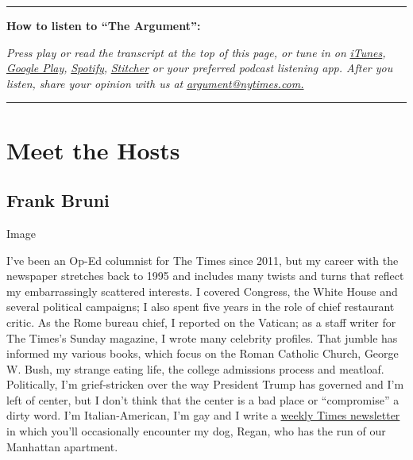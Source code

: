 \begin{center}\rule{0.5\linewidth}{\linethickness}\end{center}

\textbf{How to listen to ``The Argument'':}

\emph{Press play or read the transcript at the top of this page, or tune
in on}
\href{https://itunes.apple.com/us/podcast/the-argument/id1438024613?mt=2}{\emph{iTunes}}\emph{,}
\href{https://play.google.com/music/listen?u=0\#/ps/Idxib4hsg3yviao4gtym76knjjy}{\emph{Google
Play}}\emph{,}
\href{https://open.spotify.com/episode/5fIsHqqunLBwoxPSUUSGre?si=Rz5D9VnlRFKdGMu8ixzBOw}{\emph{Spotify}}\emph{,}
\href{https://www.stitcher.com/podcast/the-new-york-times/the-argument}{\emph{Stitcher}}
\emph{or your preferred podcast listening app. After you listen, share
your opinion with us at}
\href{mailto:argument@nytimes.com}{\emph{argument@nytimes.com.}}

\begin{center}\rule{0.5\linewidth}{\linethickness}\end{center}

\hypertarget{meet-the-hosts}{%
\section{Meet the Hosts}\label{meet-the-hosts}}

\hypertarget{frank-bruni}{%
\subsection{Frank Bruni}\label{frank-bruni}}

Image

I've been an Op-Ed columnist for The Times since 2011, but my career
with the newspaper stretches back to 1995 and includes many twists and
turns that reflect my embarrassingly scattered interests. I covered
Congress, the White House and several political campaigns; I also spent
five years in the role of chief restaurant critic. As the Rome bureau
chief, I reported on the Vatican; as a staff writer for The Times's
Sunday magazine, I wrote many celebrity profiles. That jumble has
informed my various books, which focus on the Roman Catholic Church,
George W. Bush, my strange eating life, the college admissions process
and meatloaf. Politically, I'm grief-stricken over the way President
Trump has governed and I'm left of center, but I don't think that the
center is a bad place or ``compromise'' a dirty word. I'm
Italian-American, I'm gay and I write a
\href{https://www.nytimes.com/newsletters/frank-bruni}{weekly Times
newsletter} in which you'll occasionally encounter my dog, Regan, who
has the run of our Manhattan apartment.

